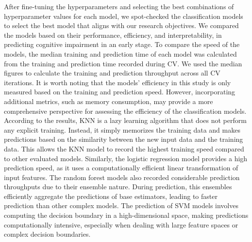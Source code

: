 After fine-tuning the hyperparameters and selecting the best combinations of hyperparameter values for each model, we spot-checked the classification models to select the best model that aligns with our research objectives. We compared the models based on their performance, efficiency, and interpretability, in predicting cognitive impairment in an early stage. To compare the speed of the models, the median training and prediction time of each model was calculated from the training and prediction time recorded during CV. We used the median figures to calculate the training and prediction throughput across all CV iterations. It is worth noting that the models' efficiency in this study is only measured based on the training and prediction speed. However, incorporating additional metrics, such as memory consumption, may provide a more comprehensive perspective for assessing the efficiency of the classification models. According to the results, KNN is a lazy learning algorithm that does not perform any explicit training. Instead, it simply memorizes the training data and makes predictions based on the similarity between the new input data and the training data. This allows the KNN model to record the highest training speed compared to other evaluated models. Similarly, the logistic regression model provides a high prediction speed, as it uses a computationally efficient linear transformation of input features. The random forest models also recorded considerable prediction throughputs due to their ensemble nature. During prediction, this ensembles efficiently aggregate the predictions of base estimators, leading to faster prediction than other complex models. The prediction of SVM models involves computing the decision boundary in a high-dimensional space, making predictions computationally intensive, especially when dealing with large feature spaces or complex decision boundaries.

